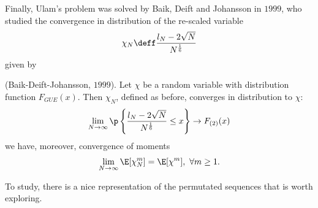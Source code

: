 Finally, Ulam's problem was solved by Baik, Deift and Johansson in $1999$, who studied the convergence in distribution of the re-scaled variable 
\begin{equation}
	\chi_N \deff \frac{l_N - 2\sqrt{N}}{N^{\frac{1}{6}}}
\end{equation}
given by
\begin{thm}
	(Baik-Deift-Johansson, $1999$). Let $\chi$ be a random variable with distribution function $F_{GUE}(x)$. Then $\chi_N$, defined as before, converges in distribution to $\chi$: 
	\begin{equation}
		\lim_{N \rightarrow \infty} \p\left\{ \frac{l_N - 2\sqrt{N}}{N^{\frac{1}{6}}} \leq x\right\} \rightarrow F_{(2)}(x)
	\end{equation}
	we have, moreover, convergence of moments
	\begin{equation}
		\lim_{N \rightarrow \infty} \E[\chi_N^m] = \E[\chi^m], \ \forall m \geq 1.
	\end{equation}
\end{thm}

To study, there is a nice representation of the permutated sequences that is worth exploring.


